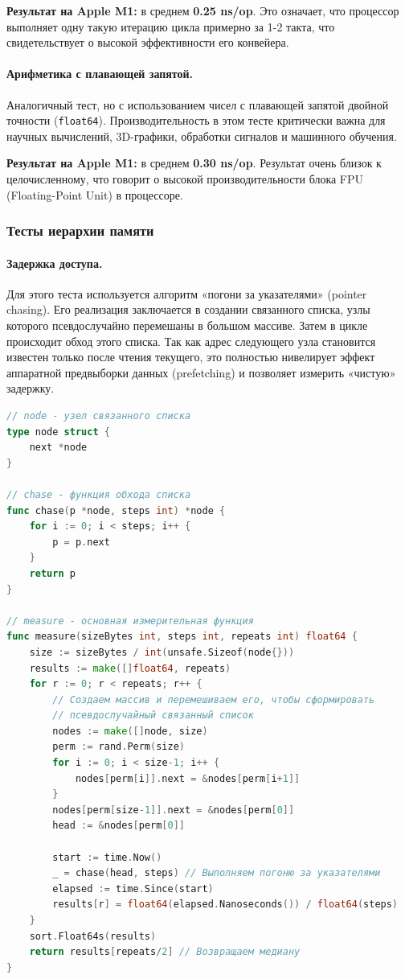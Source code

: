 \textbf{Результат на Apple M1:} в среднем \textbf{0.25 ns/op}. Это означает, что процессор выполняет одну такую итерацию цикла примерно за 1-2 такта, что свидетельствует о высокой эффективности его конвейера.

\paragraph{Арифметика с плавающей запятой.} Аналогичный тест, но с использованием чисел с плавающей запятой двойной точности (\texttt{float64}). Производительность в этом тесте критически важна для научных вычислений, 3D-графики, обработки сигналов и машинного обучения.

\textbf{Результат на Apple M1:} в среднем \textbf{0.30 ns/op}. Результат очень близок к целочисленному, что говорит о высокой производительности блока FPU (Floating-Point Unit) в процессоре.

\subsubsection{Тесты иерархии памяти}

\paragraph{Задержка доступа.} Для этого теста используется алгоритм «погони за указателями» (pointer chasing). Его реализация заключается в создании связанного списка, узлы которого псевдослучайно перемешаны в большом массиве. Затем в цикле происходит обход этого списка. Так как адрес следующего узла становится известен только после чтения текущего, это полностью нивелирует эффект аппаратной предвыборки данных (prefetching) и позволяет измерить «чистую» задержку.

\begin{lstlisting}[language=Go, caption={Реализация теста задержки памяти}]
// node - узел связанного списка
type node struct {
	next *node
}

// chase - функция обхода списка
func chase(p *node, steps int) *node {
	for i := 0; i < steps; i++ {
		p = p.next
	}
	return p
}

// measure - основная измерительная функция
func measure(sizeBytes int, steps int, repeats int) float64 {
	size := sizeBytes / int(unsafe.Sizeof(node{}))
	results := make([]float64, repeats)
	for r := 0; r < repeats; r++ {
		// Создаем массив и перемешиваем его, чтобы сформировать
		// псевдослучайный связанный список
		nodes := make([]node, size)
		perm := rand.Perm(size)
		for i := 0; i < size-1; i++ {
			nodes[perm[i]].next = &nodes[perm[i+1]]
		}
		nodes[perm[size-1]].next = &nodes[perm[0]]
		head := &nodes[perm[0]]

		start := time.Now()
		_ = chase(head, steps) // Выполняем погоню за указателями
		elapsed := time.Since(start)
		results[r] = float64(elapsed.Nanoseconds()) / float64(steps)
	}
	sort.Float64s(results)
	return results[repeats/2] // Возвращаем медиану
}
\end{lstlisting}

